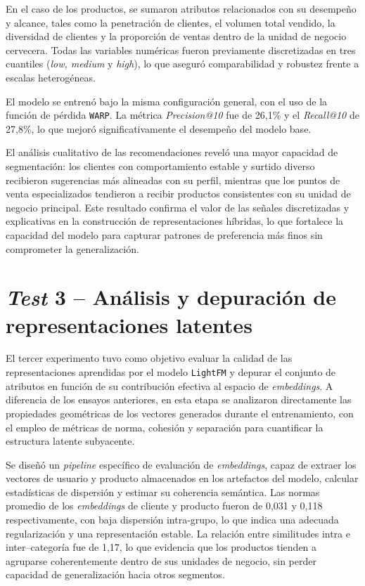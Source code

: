 En el caso de los productos, se sumaron atributos relacionados con su desempeño y alcance, tales como la penetración de clientes, el volumen total vendido, la diversidad de clientes y la proporción de ventas dentro de la unidad de negocio cervecera. Todas las variables numéricas fueron previamente discretizadas en tres cuantiles (\textit{low, medium} y \textit{high}), lo que aseguró comparabilidad y robustez frente a escalas heterogéneas.

El modelo se entrenó bajo la misma configuración general, con el uso de la función de pérdida \texttt{WARP}. La métrica \textit{Precision@10} fue de 26{,}1\% y el \textit{Recall@10} de 27{,}8\%, lo que mejoró significativamente el desempeño del modelo base.

El análisis cualitativo de las recomendaciones reveló una mayor capacidad de segmentación: los clientes con comportamiento estable y surtido diverso recibieron sugerencias más alineadas con su perfil, mientras que los puntos de venta especializados tendieron a recibir productos consistentes con su unidad de negocio principal. Este resultado confirma el valor de las señales discretizadas y explicativas en la construcción de representaciones híbridas, lo que fortalece la capacidad del modelo para capturar patrones de preferencia más finos sin comprometer la generalización.

\section{\textit{Test} 3 – Análisis y depuración de representaciones latentes}

El tercer experimento tuvo como objetivo evaluar la calidad de las representaciones aprendidas por el modelo \texttt{LightFM} y depurar el conjunto de atributos en función de su contribución efectiva al espacio de \textit{embeddings}. A diferencia de los ensayos anteriores, en esta etapa se analizaron directamente las propiedades geométricas de los vectores generados durante el entrenamiento, con el empleo de métricas de norma, cohesión y separación para cuantificar la estructura latente subyacente.

Se diseñó un \textit{pipeline} específico de evaluación de \textit{embeddings}, capaz de extraer los vectores de usuario y producto almacenados en los artefactos del modelo, calcular estadísticas de dispersión y estimar su coherencia semántica. Las normas promedio de los \textit{embeddings} de cliente y producto fueron de 0,031 y 0,118 respectivamente, con baja dispersión intra-grupo, lo que indica una adecuada regularización y una representación estable. La relación entre similitudes intra e inter–categoría fue de 1,17, lo que evidencia que los productos tienden a agruparse coherentemente dentro de sus unidades de negocio, sin perder capacidad de generalización hacia otros segmentos.

